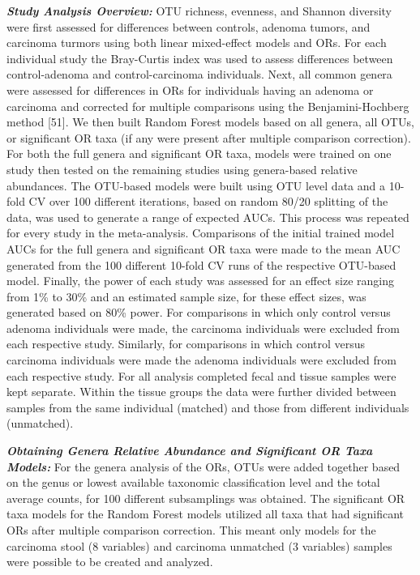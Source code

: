 \documentclass[12pt,]{article}
\begin{document}
\textbf{\emph{Study Analysis Overview:}} OTU richness, evenness, and
Shannon diversity were first assessed for differences between controls,
adenoma tumors, and carcinoma turmors using both linear mixed-effect
models and ORs. For each individual study the Bray-Curtis index was used
to assess differences between control-adenoma and control-carcinoma
individuals. Next, all common genera were assessed for differences in
ORs for individuals having an adenoma or carcinoma and corrected for
multiple comparisons using the Benjamini-Hochberg method {[}51{]}. We
then built Random Forest models based on all genera, all OTUs, or
significant OR taxa (if any were present after multiple comparison
correction). For both the full genera and significant OR taxa, models
were trained on one study then tested on the remaining studies using
genera-based relative abundances. The OTU-based models were built using
OTU level data and a 10-fold CV over 100 different iterations, based on
random 80/20 splitting of the data, was used to generate a range of
expected AUCs. This process was repeated for every study in the
meta-analysis. Comparisons of the initial trained model AUCs for the
full genera and significant OR taxa were made to the mean AUC generated
from the 100 different 10-fold CV runs of the respective OTU-based
model. Finally, the power of each study was assessed for an effect size
ranging from 1\% to 30\% and an estimated sample size, for these effect
sizes, was generated based on 80\% power. For comparisons in which only
control versus adenoma individuals were made, the carcinoma individuals
were excluded from each respective study. Similarly, for comparisons in
which control versus carcinoma individuals were made the adenoma
individuals were excluded from each respective study. For all analysis
completed fecal and tissue samples were kept separate. Within the tissue
groups the data were further divided between samples from the same
individual (matched) and those from different individuals (unmatched).

\textbf{\emph{Obtaining Genera Relative Abundance and Significant OR
Taxa Models:}} For the genera analysis of the ORs, OTUs were added
together based on the genus or lowest available taxonomic classification
level and the total average counts, for 100 different subsamplings was
obtained. The significant OR taxa models for the Random Forest models
utilized all taxa that had significant ORs after multiple comparison
correction. This meant only models for the carcinoma stool (8 variables)
and carcinoma unmatched (3 variables) samples were possible to be
created and analyzed.
\end{document}

